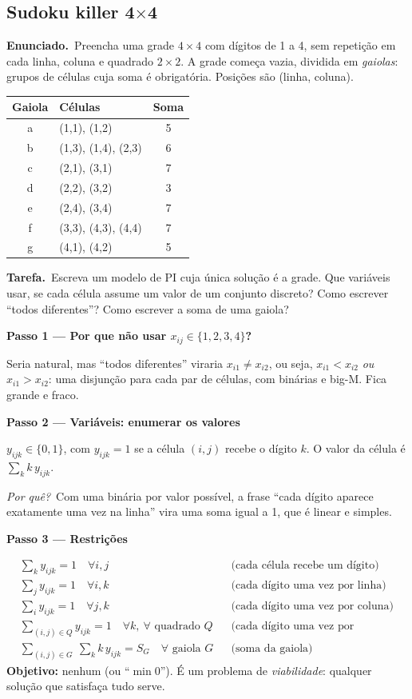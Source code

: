 \documentclass[11pt,a4paper]{article}
\newcommand{\enunciado}{\par\textbf{Enunciado.}\ }
\newcommand{\tarefa}{\par\textbf{Tarefa.}\ }
\newcommand{\passo}[1]{\par\medskip\textbf{#1}\par}
\newcommand{\porque}{\textit{Por quê?}\ }
\begin{document}
\subsection{Sudoku killer 4\texorpdfstring{$\times$}{x}4}
\enunciado Preencha uma grade $4\times4$ com dígitos de 1 a 4, sem repetição em cada linha, coluna e quadrado
$2\times2$. A grade começa vazia, dividida em \emph{gaiolas}: grupos de células cuja soma é obrigatória. Posições são
(linha, coluna).
\begin{center}
\begin{tabular}{clc}
\toprule
Gaiola & Células & Soma\\
\midrule
a & (1,1), (1,2) & 5\\
b & (1,3), (1,4), (2,3) & 6\\
c & (2,1), (3,1) & 7\\
d & (2,2), (3,2) & 3\\
e & (2,4), (3,4) & 7\\
f & (3,3), (4,3), (4,4) & 7\\
g & (4,1), (4,2) & 5\\
\bottomrule
\end{tabular}
\end{center}
\tarefa Escreva um modelo de PI cuja única solução é a grade. Que variáveis usar, se cada célula assume um valor
de um conjunto discreto? Como escrever ``todos diferentes''? Como escrever a soma de uma gaiola?

\passo{Passo 1 --- Por que não usar $x_{ij}\in\{1,2,3,4\}$?}
Seria natural, mas ``todos diferentes'' viraria $x_{i1}\ne x_{i2}$, ou seja, $x_{i1}<x_{i2}$ \emph{ou}
$x_{i1}>x_{i2}$: uma disjunção para cada par de células, com binárias e big-M. Fica grande e fraco.

\passo{Passo 2 --- Variáveis: enumerar os valores}
$y_{ijk}\in\{0,1\}$, com $y_{ijk}=1$ se a célula $(i,j)$ recebe o dígito $k$. O valor da célula é
$\sum_k k\,y_{ijk}$.

\porque Com uma binária por valor possível, a frase ``cada dígito aparece exatamente uma vez na linha'' vira uma
soma igual a 1, que é linear e simples.

\passo{Passo 3 --- Restrições}
\begin{align*}
  & \sum_k y_{ijk} = 1 \quad\forall i,j && \text{(cada célula recebe um dígito)}\\
  & \sum_j y_{ijk} = 1 \quad\forall i,k && \text{(cada dígito uma vez por linha)}\\
  & \sum_i y_{ijk} = 1 \quad\forall j,k && \text{(cada dígito uma vez por coluna)}\\
  & \sum_{(i,j)\in Q} y_{ijk} = 1 \quad\forall k,\ \forall\text{ quadrado } Q && \text{(cada dígito uma vez por quadrado)}\\
  & \sum_{(i,j)\in G}\ \sum_k k\,y_{ijk} = S_G \quad\forall\text{ gaiola } G && \text{(soma da gaiola)}
\end{align*}
\textbf{Objetivo:} nenhum (ou ``$\min 0$''). É um problema de \emph{viabilidade}: qualquer solução que
satisfaça tudo serve.
\end{document}
